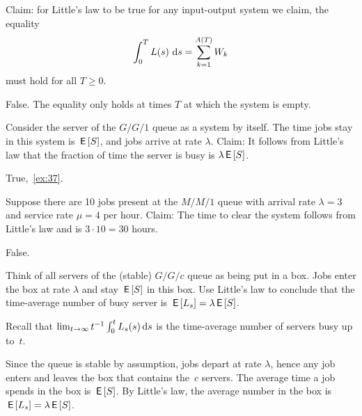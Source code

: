 \documentclass[stochastic-or.tex]{subfiles}
\begin{document}
\begin{truefalse}
Claim: for Little's law to be true for any input-output system we claim,  the equality
\begin{equation*}
 \int_0^T L(s)\, \,\textrm{d}s = \sum_{k=1}^{A(T)} W_k
\end{equation*}
must hold for  all $T\geq 0$.
\begin{solution}
False. The equality  only holds at times $T$ at which the system is empty.
\end{solution}
\end{truefalse}

\begin{truefalse}
Consider the server of the $G/G/1$ queue as a system by itself.
The time jobs stay in this system is $\,\mathsf{E}\left[S\right]$, and jobs arrive at rate $\lambda$.
Claim: It follows from Little's law that the fraction of time the server is busy is $\lambda \,\mathsf{E}\left[S\right]$.
\begin{solution} True,~\cref{ex:37}.
\end{solution}
\end{truefalse}

\begin{truefalse}
 Suppose there are 10 jobs present at the $M/M/1$ queue with arrival rate $\lambda=3$ and service rate $\mu=4$ per hour.
Claim:  The time to clear the system follows from Little's law and is $3\cdot 10 = 30$ hours.
\begin{solution}
False.
\end{solution}
\end{truefalse}

\begin{exercise}\label{ex:37}
Think of all servers of the (stable) $G/G/c$ queue as being put in a box.
Jobs enter the box at rate $\lambda$ and stay $\,\mathsf{E}\left[S\right]$ in this box.
Use Little's law to conclude that the time-average number of busy server is $\,\mathsf{E}\left[L_s\right] = \lambda \,\mathsf{E}\left[S\right]$.
\begin{hint}
Recall that $\lim_{t\to\infty} t^{-1}\int_0^t L_s(s)\,\textrm{d}s$ is the time-average number of servers busy up to~$t$.
\end{hint}
\begin{solution}
Since the queue is stable by assumption, jobs depart at rate $\lambda$, hence any job enters and leaves the box that contains the~$c$ servers.
The average time a job spends in the box is $\,\mathsf{E}\left[S\right]$.
By Little's law, the average number in the box is $\,\mathsf{E}\left[L_s\right] = \lambda \,\mathsf{E}\left[S\right]$.
\end{solution}
\end{exercise}
\end{document}

